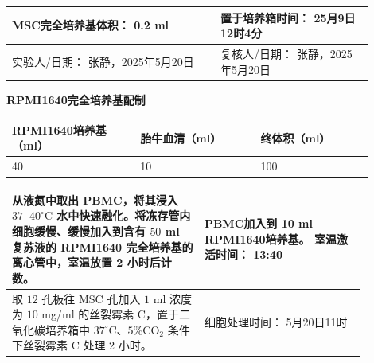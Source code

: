 \documentclass[UTF8,10pt,a4paper,fontset=fandol]{ctexart}
\newcommand{\fieldvalue}[1]{#1}
\newcommand{\handwritten}[1]{#1}
\begin{document}
\begin{tabular}{|p{0.52\linewidth}|p{0.38\linewidth}|}
\hline
MSC完全培养基体积：
\fieldvalue{\handwritten{0.2}} ml
&
置于培养箱时间：
\fieldvalue{\handwritten{25月9日12时4分}}
\\ \hline
实验人/日期：
\fieldvalue{\handwritten{张静，2025年5月20日}}
&
复核人/日期：
\fieldvalue{\handwritten{张静，2025年5月20日}}
\\ \hline
\end{tabular}

\vspace{0.5em}

\begin{center}
\textbf{RPMI1640完全培养基配制}
\end{center}

\begin{tabular}{|p{0.32\linewidth}|p{0.30\linewidth}|p{0.28\linewidth}|}
\hline
RPMI1640培养基（ml） & 胎牛血清（ml） & 终体积（ml）\\ \hline
\fieldvalue{\handwritten{40}}
&
\fieldvalue{\handwritten{10}}
&
\fieldvalue{\handwritten{100}}
\\ \hline
\end{tabular}

\vspace{0.5em}

\begin{tabular}{|p{0.48\linewidth}|p{0.40\linewidth}|}
\hline
从液氮中取出 PBMC，将其浸入 $37$--$40^\circ\mathrm{C}$ 水中快速融化。将冻存管内细胞缓慢、缓慢加入到含有 $50$ ml 复苏液的 RPMI1640 完全培养基的离心管中，室温放置 2 小时后计数。
&
PBMC加入到
\fieldvalue{\handwritten{10}} ml RPMI1640培养基。\newline
室温激活时间：
\fieldvalue{\handwritten{13:40}}
\\ \hline
取 $12$ 孔板往 MSC 孔加入 $1$ ml 浓度为 $10$ mg/ml 的丝裂霉素 C，置于二氧化碳培养箱中 $37^\circ\mathrm{C}$、$5\%\mathrm{CO}_{2}$ 条件下丝裂霉素 C 处理 2 小时。
&
细胞处理时间：
\fieldvalue{\handwritten{5月20日11时}}
\\ \hline
\end{tabular}
\end{document}
